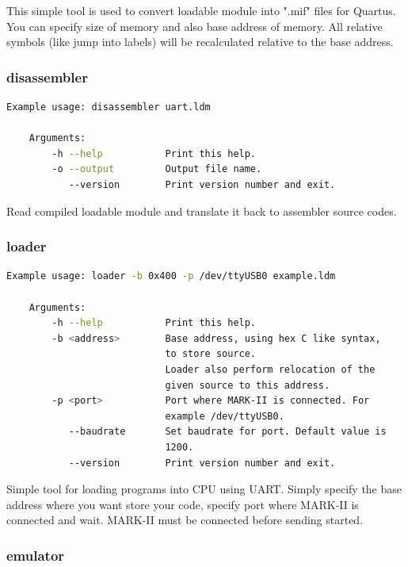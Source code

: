 This simple tool is used to convert loadable module into ".mif" files for
Quartus. You can specify size of memory and also base address of memory. All
relative symbols (like jump into labels) will be recalculated relative to the
base address.

\subsubsection{disassembler}

\begin{lstlisting}[language=bash, frame=single]
    Example usage: disassembler uart.ldm

    Arguments:
        -h --help           Print this help.
        -o --output         Output file name.
           --version        Print version number and exit.
\end{lstlisting}

Read compiled loadable module and translate it back to assembler source codes.

\subsubsection{loader}

\begin{lstlisting}[language=bash, frame=single]
    Example usage: loader -b 0x400 -p /dev/ttyUSB0 example.ldm

    Arguments:
        -h --help           Print this help.
        -b <address>        Base address, using hex C like syntax,
                            to store source.
                            Loader also perform relocation of the
                            given source to this address.
        -p <port>           Port where MARK-II is connected. For
                            example /dev/ttyUSB0.
           --baudrate       Set baudrate for port. Default value is
                            1200.
           --version        Print version number and exit.
\end{lstlisting}

Simple tool for loading programs into CPU using UART. Simply specify the base
address where you want store your code, specify port where MARK-II is connected
and wait. MARK-II must be connected before sending started.

\subsubsection{emulator}

